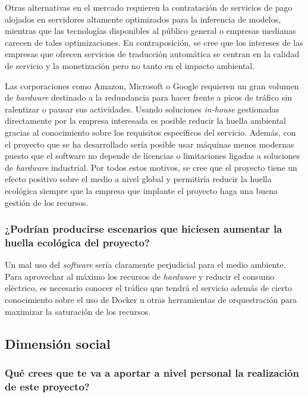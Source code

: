Otras alternativas en el mercado requieren la contratación de servicios de pago alojados en servidores altamente optimizados para la inferencia de modelos, mientras que las tecnologías disponibles al público general o empresas medianas carecen de tales optimizaciones. En contraposición, se cree que los intereses de las empresas que ofrecen servicios de traducción automática se centran en la calidad de servicio y la monetización pero no tanto en el impacto ambiental.

Las corporaciones como Amazon, Microsoft o Google requieren un gran volumen de \textit{hardware} destinado a la redundancia para hacer frente a picos de tráfico sin ralentizar o pausar sus actividades. Usando soluciones \textit{in-house} gestionadas directamente por la empresa interesada es posible reducir la huella ambiental gracias al conocimiento sobre los requisitos específicos del servicio.
Además, con el proyecto que se ha desarrollado sería posible usar máquinas menos modernas puesto que el software no depende de licencias o limitaciones ligadas a soluciones de \textit{hardware} industrial. Por todos estos motivos, se cree que el proyecto tiene un efecto positivo sobre el medio a nivel global y permitiría reducir la huella ecológica siempre que la empresa que implante el proyecto haga una buena gestión de los recursos.

\subsubsection{¿Podrían producirse escenarios que hiciesen aumentar la huella ecológica del proyecto?}

Un mal uso del \textit{software} sería claramente perjudicial para el medio ambiente. Para aprovechar al máximo los recursos de \textit{hardware} y reducir el consumo eléctrico, es necesario conocer el tráfico que tendrá el servicio además de cierto conocimiento sobre el uso de Docker u otras herramientas de orquestración para maximizar la saturación de los recursos.



\subsection{Dimensión social}
\subsubsection{Qué crees que te va a aportar a nivel personal la realización de este proyecto?}

